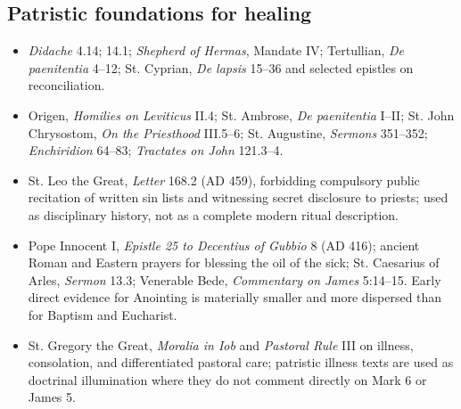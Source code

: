 \subsection*{Patristic foundations for healing}
{\footnotesize
\begin{itemize}[nosep]
\item \emph{Didache} 4.14; 14.1; \emph{Shepherd of Hermas}, Mandate IV; Tertullian, \emph{De paenitentia} 4--12; St. Cyprian, \emph{De lapsis} 15--36 and selected epistles on reconciliation.
\item Origen, \emph{Homilies on Leviticus} II.4; St. Ambrose, \emph{De paenitentia} I--II; St. John Chrysostom, \emph{On the Priesthood} III.5--6; St. Augustine, \emph{Sermons} 351--352; \emph{Enchiridion} 64--83; \emph{Tractates on John} 121.3--4.
\item St. Leo the Great, \emph{Letter} 168.2 (AD 459), forbidding compulsory public recitation of written sin lists and witnessing secret disclosure to priests; used as disciplinary history, not as a complete modern ritual description.
\item Pope Innocent I, \emph{Epistle 25 to Decentius of Gubbio} 8 (AD 416); ancient Roman and Eastern prayers for blessing the oil of the sick; St. Caesarius of Arles, \emph{Sermon} 13.3; Venerable Bede, \emph{Commentary on James} 5:14--15. Early direct evidence for Anointing is materially smaller and more dispersed than for Baptism and Eucharist.
\item St. Gregory the Great, \emph{Moralia in Iob} and \emph{Pastoral Rule} III on illness, consolation, and differentiated pastoral care; patristic illness texts are used as doctrinal illumination where they do not comment directly on Mark 6 or James 5.
\end{itemize}
}

